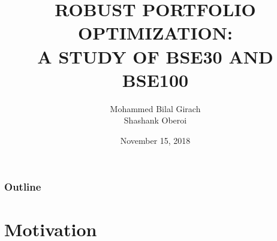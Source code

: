 \documentclass{beamer}
\title[ROBUST PORTFOLIO OPTIMIZATION]{ROBUST PORTFOLIO OPTIMIZATION:\\
A STUDY OF BSE30 AND BSE100} %
\author{Mohammed Bilal Girach \\ Shashank Oberoi} %
\institute[]{
Department of Mathematics \\ %
\medskip
IIT Guwahati
}
\date{November 15, 2018}
\begin{document}
\begin{frame}
\titlepage %
\end{frame}

\begin{frame}
\frametitle{Outline} %
\tableofcontents %
\end{frame}


\section{Motivation} %

\end{document}
